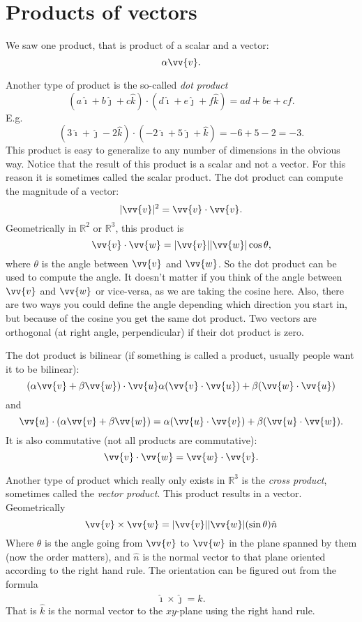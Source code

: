\documentclass[11pt]{article}
\newcommand{\sabs}[1]{\lvert {#1} \rvert}
\newcommand{\R}{{\mathbb{R}}}
\newcommand{\veci}{\hat{\imath}}
\newcommand{\vecj}{\hat{\jmath}}
\newcommand{\veck}{\hat{k}}
\begin{document}

\section{Products of vectors}

We saw one product, that is product of a scalar and a vector:
$$
\alpha \vv{v}.
$$

Another type of product is the so-called \emph{dot product}
$$
( a \veci + b \vecj + c \veck ) \cdot
( d \veci + e \vecj + f \veck ) =
ad + be + cf .
$$
E.g.
$$
( 3 \veci + \vecj -2 \veck ) \cdot
( - 2\veci + 5 \vecj + \veck ) =
-6 + 5 -2 = -3 .
$$
This product is easy to generalize to any number of dimensions in the obvious way.
Notice that the result of this product is a scalar and not a vector.
For this reason it is sometimes called the scalar product.
The dot product can compute the magnitude of a vector:
$$
\sabs{\vv{v}}^2 = \vv{v} \cdot \vv{v} .
$$
Geometrically in $\R^2$ or $\R^3$, this product is
$$
\vv{v} \cdot \vv{w} = \sabs{\vv{v}} \sabs{\vv{w}} \cos \theta ,
$$
where $\theta$ is the angle between $\vv{v}$ and $\vv{w}$.
So the dot product can be used to compute the angle.
It doesn't matter if you think of the angle
between $\vv{v}$ and $\vv{w}$ or vice-versa, as we are taking the cosine here.
Also, there are two ways you could define the angle depending which direction you start in,
but because of the cosine you get the same dot product.
Two vectors are orthogonal
(at right angle, perpendicular) if their dot product is zero.

The dot product is bilinear (if something is called a product, usually people want it to be bilinear):
$$
( \alpha \vv{v} + \beta \vv{w} ) \cdot \vv{u}
\alpha (\vv{v} \cdot \vv{u}) + \beta (\vv{w} \cdot \vv{u})
$$
and
$$
\vv{u} \cdot
( \alpha \vv{v} + \beta \vv{w} )
=
\alpha (\vv{u} \cdot \vv{v}) + \beta (\vv{u} \cdot \vv{w}) .
$$
It is also commutative (not all products are commutative):
$$
\vv{v} \cdot \vv{w} = \vv{w} \cdot \vv{v} .
$$

Another type of product which really only exists in $\R^3$ is the
\emph{cross product},
sometimes called the \emph{vector product}.
This product results in a vector.
Geometrically
$$
\vv{v} \times \vv{w} = \sabs{\vv{v}} \sabs{\vv{w}} (\sin \theta) \hat{n}
$$
Where $\theta$ is the angle going from $\vv{v}$ to $\vv{w}$ in the plane spanned by them
(now the order matters),
and $\hat{n}$ is the normal vector to that plane oriented according to the right hand rule.
The orientation can be figured out from the formula
$$
\veci \times \vecj = \veck .
$$
That is $\veck$ is the normal vector to the $xy$-plane using the right hand rule.
\end{document}
